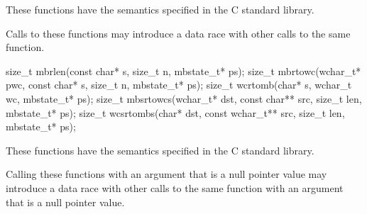 \begin{itemdescr}
\pnum
\effects
These functions have the semantics specified in the C standard library.

\pnum
\remarks
Calls to these functions
may introduce a data race
with other calls to the same function.
\end{itemdescr}


%
%
%
%
%
\begin{itemdecl}
size_t mbrlen(const char* s, size_t n, mbstate_t* ps);
size_t mbrtowc(wchar_t* pwc, const char* s, size_t n, mbstate_t* ps);
size_t wcrtomb(char* s, wchar_t wc, mbstate_t* ps);
size_t mbsrtowcs(wchar_t* dst, const char** src, size_t len, mbstate_t* ps);
size_t wcsrtombs(char* dst, const wchar_t** src, size_t len, mbstate_t* ps);
\end{itemdecl}

\begin{itemdescr}
\pnum
\effects
These functions have the semantics specified in the C standard library.

\pnum
\remarks
Calling these functions
with an  argument that is a null pointer value
may introduce a data race
with other calls to the same function
with an  argument that is a null pointer value.
\end{itemdescr}

